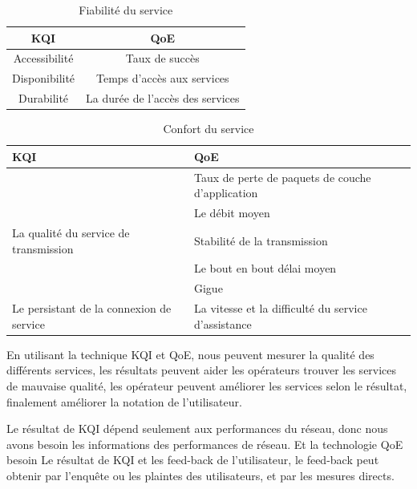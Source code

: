\begin{table}[H]
	\centering
	\caption{Fiabilité du service }
	\label{table.fiabilité}
\begin{tabular}{|c|c|}
\hline \rule[-2ex]{0pt}{5.5ex} KQI & QoE \\ 
\hline \rule[-2ex]{0pt}{5.5ex} Accessibilité & Taux de succès  \\ 
\hline \rule[-2ex]{0pt}{5.5ex} Disponibilité  & Temps d'accès aux services \\ 
\hline \rule[-2ex]{0pt}{5.5ex} Durabilité & La durée de l'accès des services \\ 
\hline 
\end{tabular} 
\end{table}

\begin{table}[H]
	\centering
	\caption{Confort du service}
	\label{table.confort}
\begin{tabular}{|>{\centering\arraybackslash}p{5 cm}|>{\centering\arraybackslash}p{6 cm}|}
\hline KQI & QoE \\ 
\hline  & Taux de perte de paquets de couche d'application \\ 
\hline  & Le débit moyen  \newline \\ 
\hline La qualité du service de transmission & Stabilité de la transmission \\ 
\hline & Le bout en bout délai moyen \newline  \\ 
\hline & Gigue \newline  \\ 
\hline Le persistant de la connexion de service & La vitesse et la difficulté du service d'assistance\\ 
\hline 
\end{tabular} 
\end{table}

En utilisant la technique KQI et QoE, nous peuvent mesurer la qualité des différents services, les résultats peuvent aider les opérateurs trouver les services de mauvaise qualité, les opérateur peuvent améliorer les services selon le résultat, finalement améliorer la notation de l'utilisateur.  

Le résultat de KQI dépend seulement aux performances du réseau, donc nous avons besoin les informations des performances de réseau. Et la technologie QoE besoin Le résultat de KQI et les feed-back de l'utilisateur, le feed-back peut obtenir par l'enquête ou les plaintes des utilisateurs,  et par les mesures directs.

